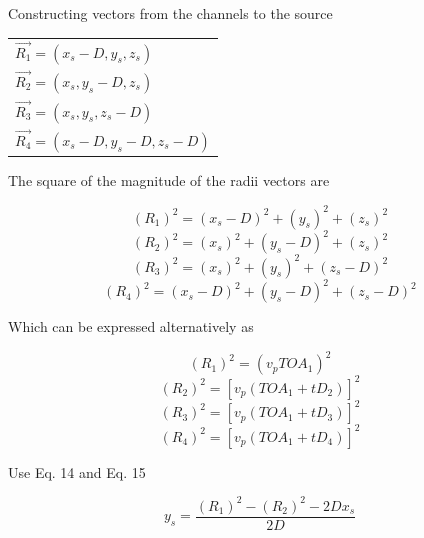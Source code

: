 \documentclass[12pt]{article}
\begin{document}
\noindent Constructing vectors from the channels to the source

\begin{center}
\begin{tabular}{l}
$\overrightarrow{R_1} = (x_s-D,y_s,z_s)$\\
$\overrightarrow{R_2} = (x_s,y_s-D,z_s)$\\
$\overrightarrow{R_3} = (x_s,y_s,z_s-D)$\\
$\overrightarrow{R_4} = (x_s-D,y_s-D,z_s-D)$\\
\end{tabular}
\end{center}

\noindent The square of the magnitude of the radii vectors are

\begin{center}
\begin{equation} \label{eq:14}
(R_1)^2 = (x_s-D)^2 + (y_s)^2 + (z_s)^2
\end{equation}
\begin{equation} \label{eq:15}
(R_2)^2 = (x_s)^2 + (y_s-D)^2 + (z_s)^2
\end{equation}
\begin{equation} \label{eq:16}
(R_3)^2 = (x_s)^2 + (y_s)^2 + (z_s-D)^2
\end{equation}
\begin{equation} \label{eq:17}
(R_4)^2 = (x_s-D)^2 + (y_s-D)^2 + (z_s-D)^2
\end{equation}
\end{center}

\vspace{5 mm}
\noindent Which can be expressed alternatively as

\begin{center}
\begin{equation} \label{eq:18}
(R_1)^2 = (v_p TOA_1)^2
\end{equation}
\begin{equation} \label{eq:19}
(R_2)^2 = [v_p (TOA_1 + tD_2)]^2
\end{equation}
\begin{equation} \label{eq:20}
(R_3)^2 = [v_p (TOA_1 + tD_3)]^2
\end{equation}
\begin{equation} \label{eq:21}
(R_4)^2 = [v_p (TOA_1 + tD_4)]^2
\end{equation}
\end{center}

\pagebreak

\noindent Use Eq. 14 and Eq. 15
\begin{center}
\begin{equation} \label{eq:22}
y_s = \frac{(R_1)^2 - (R_2)^2 - 2Dx_s}{2D}
\end{equation}
\end{center}
\end{document}

